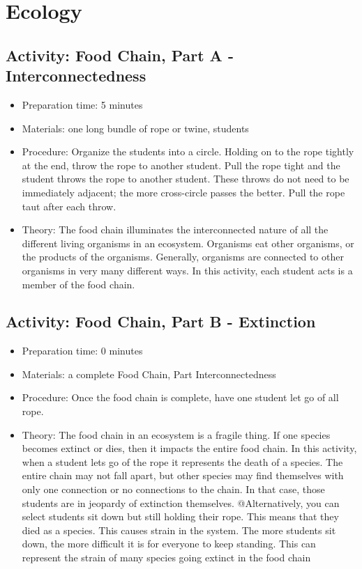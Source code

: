 \section{Ecology}
\subsection{Activity: Food Chain, Part A - Interconnectedness}
\begin{itemize}
\item{Preparation time: 5 minutes}
\item{Materials: one long bundle of rope or twine, students}
\item{Procedure: Organize the students into a circle. Holding on to the rope tightly at the end, throw the rope to another student. Pull the rope tight and the student throws the rope to another student. These throws do not need to be immediately adjacent; the more cross-circle passes the better. Pull the rope taut after each throw.}
\item{Theory: The food chain illuminates the interconnected nature of all the different living organisms in an ecosystem. Organisms eat other organisms, or the products of the organisms. Generally, organisms are connected to other organisms in very many different ways. In this activity, each student acts is a member of the food chain.}
\end{itemize}

\subsection{Activity: Food Chain, Part B - Extinction}
\begin{itemize}
\item{Preparation time: 0 minutes}
\item{Materials: a complete Food Chain, Part Interconnectedness}
\item{Procedure: Once the food chain is complete, have one student let go of all rope.}
\item{Theory: The food chain in an ecosystem is a fragile thing. If one species becomes extinct or dies, then it impacts the entire food chain. In this activity, when a student lets go of the rope it represents the death of a species. The entire chain may not fall apart, but other species may find themselves with only one connection or no connections to the chain. In that case, those students are in jeopardy of extinction themselves. @Alternatively, you can select students sit down but still holding their rope. This means that they died as a species. This causes strain in the system. The more students sit down, the more difficult it is for everyone to keep standing. This can represent the strain of many species going extinct in the food chain}
\end{itemize}

